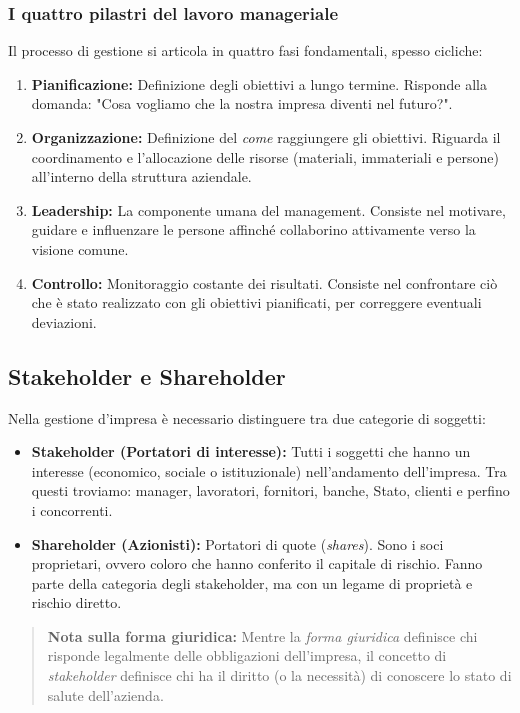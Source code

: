 \documentclass[a4paper,12pt]{article}
\begin{document}
	\subsubsection{I quattro pilastri del lavoro manageriale}
	Il processo di gestione si articola in quattro fasi fondamentali, spesso cicliche:
	
	\begin{enumerate}
		\item \textbf{Pianificazione:} Definizione degli obiettivi a lungo termine. Risponde alla domanda: "Cosa vogliamo che la nostra impresa diventi nel futuro?".
		\item \textbf{Organizzazione:} Definizione del \textit{come} raggiungere gli obiettivi. Riguarda il coordinamento e l'allocazione delle risorse (materiali, immateriali e persone) all'interno della struttura aziendale.
		\item \textbf{Leadership:} La componente umana del management. Consiste nel motivare, guidare e influenzare le persone affinché collaborino attivamente verso la visione comune.
		\item \textbf{Controllo:} Monitoraggio costante dei risultati. Consiste nel confrontare ciò che è stato realizzato con gli obiettivi pianificati, per correggere eventuali deviazioni.
	\end{enumerate}\subsection{Stakeholder e Shareholder}
	Nella gestione d'impresa è necessario distinguere tra due categorie di soggetti:
	
	\begin{itemize}
	\item \textbf{Stakeholder (Portatori di interesse):} Tutti i soggetti che hanno un interesse (economico, sociale o istituzionale) nell'andamento dell'impresa. 
	Tra questi troviamo: manager, lavoratori, fornitori, banche, Stato, clienti e perfino i concorrenti.
	\item \textbf{Shareholder (Azionisti):} Portatori di quote (\textit{shares}). Sono i soci proprietari, ovvero coloro che hanno conferito il capitale di rischio. Fanno parte della categoria degli stakeholder, ma con un legame di proprietà e rischio diretto.
	\end{itemize}
	
	\begin{quote}
	\textbf{Nota sulla forma giuridica:} Mentre la \textit{forma giuridica} definisce chi risponde legalmente delle obbligazioni dell'impresa, il concetto di \textit{stakeholder} definisce chi ha il diritto (o la necessità) di conoscere lo stato di salute dell'azienda.
	\end{quote}
	
\end{document}
